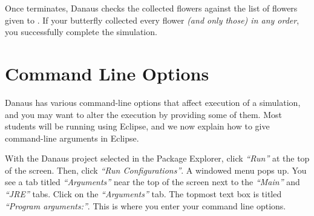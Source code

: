 \documentclass{pset}
\begin{document}
Once  terminates, Danaus checks the collected flowers against the
list of flowers given to . If your butterfly collected every flower
\emph{(and only those) in any order}, you successfully complete the simulation.
\fi
\fi

\ifx \CLO \undefined \else
\section{Command Line Options}
Danaus has various command-line options that affect execution of a simulation,
and you may want to alter the execution by providing some of them. Most
students will be running using Eclipse, and we now explain how to give
command-line arguments in Eclipse.

With the Danaus project selected in the Package Explorer, click \emph{``Run''}
at the top of the screen. Then, click \emph{``Run Configurations''}. A windowed
menu pops up. You  see a tab titled \emph{``Arguments''} near the top of the
screen next to the \emph{``Main''} and \emph{``JRE''} tabs. Click on the
\emph{``Arguments''} tab. The topmost text box is titled \emph{``Program
arguments:''}. This is where you enter your command line options.
\end{document}
